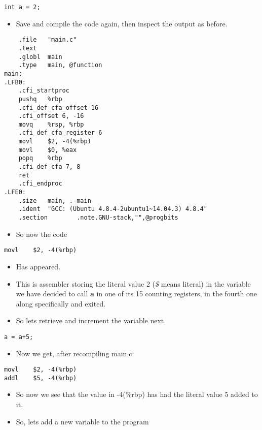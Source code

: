 \documentclass[minimal, t]{article}
\begin{document}
\begin{verbatim}
int a = 2;
\end{verbatim}

\begin{itemize}
\item Save and compile the code again, then inspect the output as before.
\end{itemize}

\begin{verbatim}
	.file   "main.c"
	.text
	.globl  main
	.type   main, @function
main:
.LFB0:
	.cfi_startproc
	pushq   %rbp
	.cfi_def_cfa_offset 16
	.cfi_offset 6, -16
	movq    %rsp, %rbp
	.cfi_def_cfa_register 6
	movl    $2, -4(%rbp)
	movl    $0, %eax
	popq    %rbp
	.cfi_def_cfa 7, 8
	ret
	.cfi_endproc
.LFE0:
	.size   main, .-main
	.ident  "GCC: (Ubuntu 4.8.4-2ubuntu1~14.04.3) 4.8.4"
	.section        .note.GNU-stack,"",@progbits
\end{verbatim}

\begin{itemize}
\item So now the code
\end{itemize}

\begin{verbatim}
movl    $2, -4(%rbp)
\end{verbatim}
\begin{itemize}
\item Has appeared.
\item This is assembler storing the literal value 2 (\emph{\$} means
literal) in the variable we have decided to call \textbf{a} in one of its
15 counting registers, in the fourth one along specifically and
exited.

\item So lets retrieve and increment the variable next
\end{itemize}
\begin{verbatim}
a = a+5;
\end{verbatim}
\begin{itemize}
\item Now we get, after recompiling main.c:
\end{itemize}
\begin{verbatim}
movl    $2, -4(%rbp)
addl    $5, -4(%rbp)
\end{verbatim}
\begin{itemize}
\item So now we see that the value in -4(\%rbp) has had the literal value 5
added to it.
\item So, lets add a new variable to the program
\end{itemize}
\end{document}
